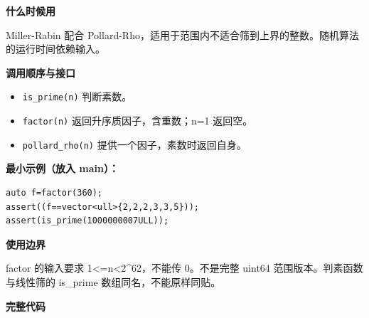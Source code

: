 \documentclass[UTF8,a4paper,10pt]{ctexart}
\newcommand{\TemplUsage}[1]{\textbf{什么时候用}\par #1\par}
\newcommand{\TemplApi}[1]{\textbf{调用顺序与接口}\par #1\par}
\newcommand{\TemplNote}[1]{\textbf{使用边界}\par #1\par}
\begin{document}
\TemplUsage{Miller-Rabin 配合 Pollard-Rho，适用于范围内不适合筛到上界的整数。随机算法的运行时间依赖输入。}
\TemplApi{\begin{itemize}
\item \texttt{is\_prime(n)} 判断素数。
\item \texttt{factor(n)} 返回升序质因子，含重数；n=1 返回空。
\item \texttt{pollard\_rho(n)} 提供一个因子，素数时返回自身。
\end{itemize}}
\textbf{最小示例（放入 main）：}
\begin{lstlisting}
auto f=factor(360);
assert((f==vector<ull>{2,2,2,3,3,5}));
assert(is_prime(1000000007ULL));
\end{lstlisting}
\TemplNote{factor 的输入要求 1<=n<2\textasciicircum{}62，不能传 0。不是完整 uint64 范围版本。判素函数与线性筛的 is\_prime 数组同名，不能原样同贴。}
\textbf{完整代码}
\end{document}
